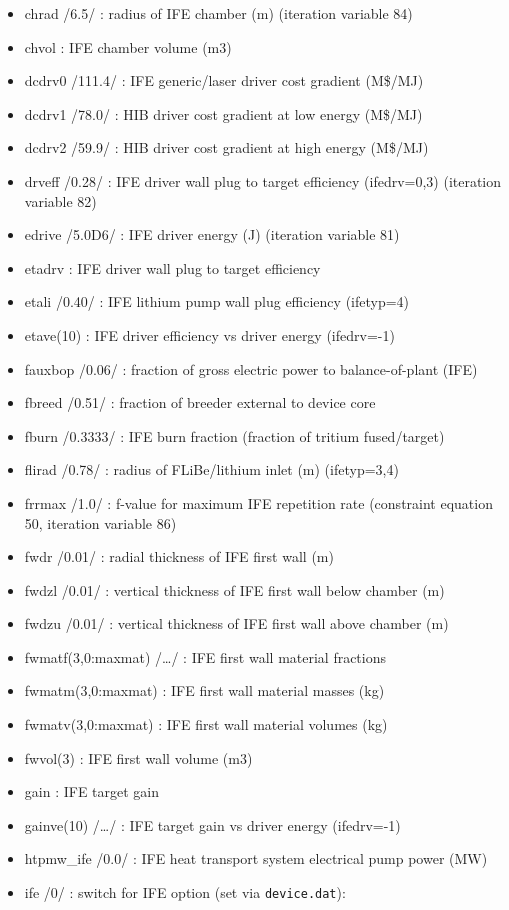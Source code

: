 \documentclass[]{article}
\begin{document}
\begin{itemize}
\item
  chrad /6.5/ : radius of IFE chamber (m) (iteration variable 84)
\item
  chvol : IFE chamber volume (m3)
\item
  dcdrv0 /111.4/ : IFE generic/laser driver cost gradient (M\$/MJ)
\item
  dcdrv1 /78.0/ : HIB driver cost gradient at low energy (M\$/MJ)
\item
  dcdrv2 /59.9/ : HIB driver cost gradient at high energy (M\$/MJ)
\item
  drveff /0.28/ : IFE driver wall plug to target efficiency (ifedrv=0,3)
  (iteration variable 82)
\item
  edrive /5.0D6/ : IFE driver energy (J) (iteration variable 81)
\item
  etadrv : IFE driver wall plug to target efficiency
\item
  etali /0.40/ : IFE lithium pump wall plug efficiency (ifetyp=4)
\item
  etave(10) : IFE driver efficiency vs driver energy (ifedrv=-1)
\item
  fauxbop /0.06/ : fraction of gross electric power to balance-of-plant
  (IFE)
\item
  fbreed /0.51/ : fraction of breeder external to device core
\item
  fburn /0.3333/ : IFE burn fraction (fraction of tritium fused/target)
\item
  flirad /0.78/ : radius of FLiBe/lithium inlet (m) (ifetyp=3,4)
\item
  frrmax /1.0/ : f-value for maximum IFE repetition rate (constraint
  equation 50, iteration variable 86)
\item
  fwdr /0.01/ : radial thickness of IFE first wall (m)
\item
  fwdzl /0.01/ : vertical thickness of IFE first wall below chamber (m)
\item
  fwdzu /0.01/ : vertical thickness of IFE first wall above chamber (m)
\item
  fwmatf(3,0:maxmat) /\ldots{}/ : IFE first wall material fractions
\item
  fwmatm(3,0:maxmat) : IFE first wall material masses (kg)
\item
  fwmatv(3,0:maxmat) : IFE first wall material volumes (kg)
\item
  fwvol(3) : IFE first wall volume (m3)
\item
  gain : IFE target gain
\item
  gainve(10) /\ldots{}/ : IFE target gain vs driver energy (ifedrv=-1)
\item
  htpmw\_ife /0.0/ : IFE heat transport system electrical pump power
  (MW)
\item
  ife /0/ : switch for IFE option (set via \texttt{device.dat}):


\end{itemize}
\end{document}

